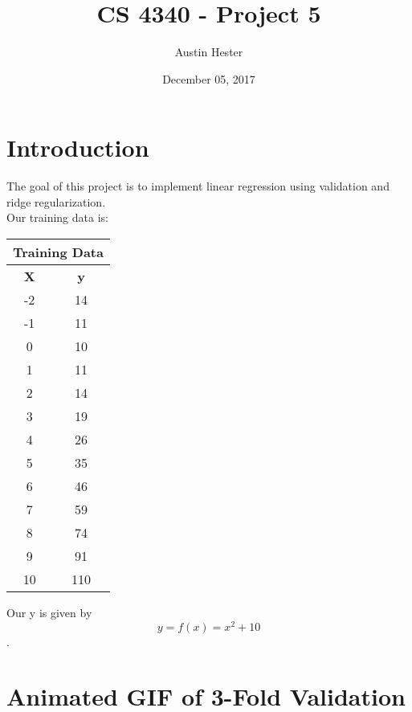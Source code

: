 \documentclass{article}
\begin{document}
\title{CS 4340 - Project 5}
\author{Austin Hester}
\date{December 05, 2017}
\maketitle

\makeatletter
\def\@seccntformat#1{%
	 \expandafter\ifx\csname c@#1\endcsname\c@section\else
	  \csname the#1\endcsname\quad
  \fi}
\makeatother



\section*{Introduction}

The goal of this project is to implement linear regression using validation and ridge regularization. \\

Our training data is:  

\begin{center}
\begin{tabular}{|c|c|}
	\hline
	\multicolumn{2}{|c|}{\textbf{Training Data}} \\\hline
	\textbf{X} & \textbf{y} \\\hline
	-2 & 14 \\
	-1 & 11\\
	0 & 10\\
	1 & 11 \\
	2 & 14\\
	3 & 19 \\
	4 & 26\\
	5 & 35\\
	6 & 46\\
	7 & 59\\
	8 & 74\\
	9 & 91\\
	10 & 110\\
	\hline
\end{tabular}
\end{center}

Our y is given by $$y = f(x) = x^2 + 10$$.

\newpage
\section*{Animated GIF of 3-Fold Validation}
\begin{center}
\hspace{-6em} 
\end{center}
\end{document}
